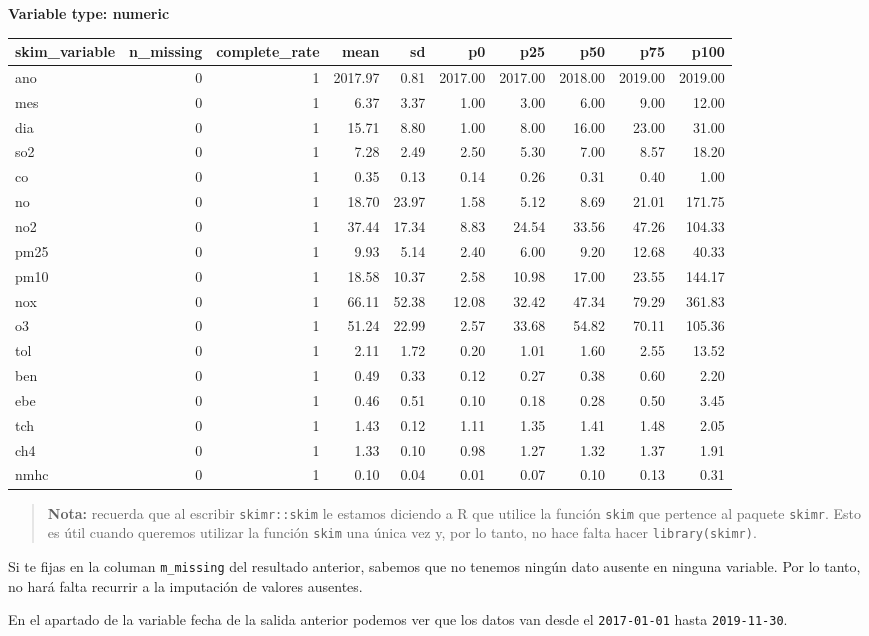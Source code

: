 \documentclass[]{article}
\begin{document}
\textbf{Variable type: numeric}

\begin{longtable}[]{@{}lrrrrrrrrr@{}}
\toprule
skim\_variable & n\_missing & complete\_rate & mean & sd & p0 & p25 &
p50 & p75 & p100\tabularnewline
\midrule
\endhead
ano & 0 & 1 & 2017.97 & 0.81 & 2017.00 & 2017.00 & 2018.00 & 2019.00 &
2019.00\tabularnewline
mes & 0 & 1 & 6.37 & 3.37 & 1.00 & 3.00 & 6.00 & 9.00 &
12.00\tabularnewline
dia & 0 & 1 & 15.71 & 8.80 & 1.00 & 8.00 & 16.00 & 23.00 &
31.00\tabularnewline
so2 & 0 & 1 & 7.28 & 2.49 & 2.50 & 5.30 & 7.00 & 8.57 &
18.20\tabularnewline
co & 0 & 1 & 0.35 & 0.13 & 0.14 & 0.26 & 0.31 & 0.40 &
1.00\tabularnewline
no & 0 & 1 & 18.70 & 23.97 & 1.58 & 5.12 & 8.69 & 21.01 &
171.75\tabularnewline
no2 & 0 & 1 & 37.44 & 17.34 & 8.83 & 24.54 & 33.56 & 47.26 &
104.33\tabularnewline
pm25 & 0 & 1 & 9.93 & 5.14 & 2.40 & 6.00 & 9.20 & 12.68 &
40.33\tabularnewline
pm10 & 0 & 1 & 18.58 & 10.37 & 2.58 & 10.98 & 17.00 & 23.55 &
144.17\tabularnewline
nox & 0 & 1 & 66.11 & 52.38 & 12.08 & 32.42 & 47.34 & 79.29 &
361.83\tabularnewline
o3 & 0 & 1 & 51.24 & 22.99 & 2.57 & 33.68 & 54.82 & 70.11 &
105.36\tabularnewline
tol & 0 & 1 & 2.11 & 1.72 & 0.20 & 1.01 & 1.60 & 2.55 &
13.52\tabularnewline
ben & 0 & 1 & 0.49 & 0.33 & 0.12 & 0.27 & 0.38 & 0.60 &
2.20\tabularnewline
ebe & 0 & 1 & 0.46 & 0.51 & 0.10 & 0.18 & 0.28 & 0.50 &
3.45\tabularnewline
tch & 0 & 1 & 1.43 & 0.12 & 1.11 & 1.35 & 1.41 & 1.48 &
2.05\tabularnewline
ch4 & 0 & 1 & 1.33 & 0.10 & 0.98 & 1.27 & 1.32 & 1.37 &
1.91\tabularnewline
nmhc & 0 & 1 & 0.10 & 0.04 & 0.01 & 0.07 & 0.10 & 0.13 &
0.31\tabularnewline
\bottomrule
\end{longtable}

\begin{quote}
\textbf{Nota:} recuerda que al escribir \texttt{skimr::skim} le estamos
diciendo a R que utilice la función \texttt{skim} que pertence al
paquete \texttt{skimr}. Esto es útil cuando queremos utilizar la función
\texttt{skim} una única vez y, por lo tanto, no hace falta hacer
\texttt{library(skimr)}.
\end{quote}

Si te fijas en la columan \texttt{m\_missing} del resultado anterior,
sabemos que no tenemos ningún dato ausente en ninguna variable. Por lo
tanto, no hará falta recurrir a la imputación de valores ausentes.

En el apartado de la variable fecha de la salida anterior podemos ver
que los datos van desde el \texttt{2017-01-01} hasta
\texttt{2019-11-30}.
\end{document}
